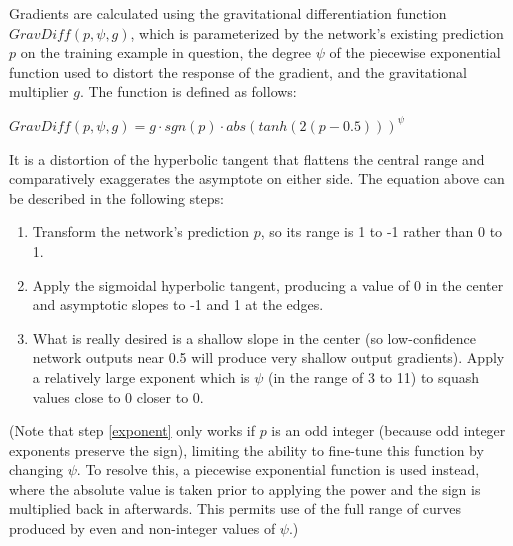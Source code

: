 \documentclass[10pt]{article}
\begin{document}
Gradients are calculated using the gravitational differentiation function $GravDiff(p, \psi, g)$, which is parameterized by the network's existing prediction $p$ on the training example in question, the degree $\psi$ of the piecewise exponential function used to distort the response of the gradient, and the gravitational multiplier $g$. The function is defined as follows:

$GravDiff(p, \psi, g) = g \cdot sgn(p) \cdot abs(tanh(2(p - 0.5))) ^ \psi$

It is a distortion of the hyperbolic tangent that flattens the central range and comparatively exaggerates the asymptote on either side. The equation above can be described in the following steps:

\begin{enumerate}
    \item Transform the network's prediction $p$, so its range is 1 to -1 rather than 0 to 1.
    \item Apply the sigmoidal hyperbolic tangent, producing a value of 0 in the center and asymptotic slopes to -1 and 1 at the edges.
    \item \label{exponent} What is really desired is a shallow slope in the center (so low-confidence network outputs near 0.5 will produce very shallow output gradients). Apply a relatively large exponent which is $\psi$ (in the range of 3 to 11) to squash values close to 0 closer to 0.
\end{enumerate}

(Note that step \ref{exponent} only works if $p$ is an odd integer (because odd integer exponents preserve the sign), limiting the ability to fine-tune this function by changing $\psi$. To resolve this, a piecewise exponential function is used instead, where the absolute value is taken prior to applying the power and the sign is multiplied back in afterwards. This permits use of the full range of curves produced by even and non-integer values of $\psi$.)
\end{document}
